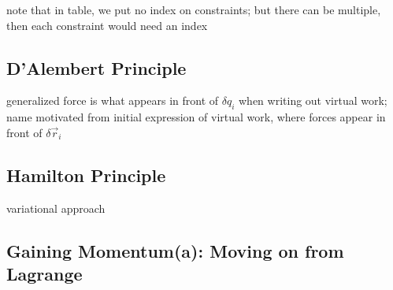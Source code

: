 \documentclass[../class_mech_main.tex]{subfiles}
\begin{document}
note that in table, we put no index on constraints; but there can be multiple, then each constraint would need an index


		\subsection{D'Alembert Principle}


generalized force is what appears in front of $\delta q_i$ when writing out virtual work; name motivated from initial expression of virtual work, where forces appear in front of $\delta \vec{r}_i$



		\subsection{Hamilton Principle}
variational approach



		\subsection{Gaining Momentum(a): Moving on from Lagrange}
\end{document}
